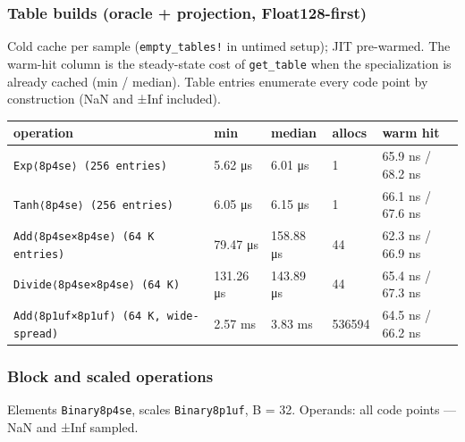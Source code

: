 \subsubsection{Table builds (oracle + projection, Float128-first)}



\label{17249747280115456051}{}


Cold cache per sample (\texttt{empty\_\allowbreak{}tables!} in untimed setup); JIT pre-warmed. The warm-hit column is the steady-state cost of \texttt{get\_\allowbreak{}table} when the specialization is already cached (min / median). Table entries enumerate every code point by construction (NaN and ±Inf included).




\begin{table}[h]
\centering
\begin{tabulary}{\linewidth}{L L L L L}
\toprule
operation & min & median & allocs & warm hit \\
\toprule
\texttt{Exp⟨8p4se⟩ (256 entries)} & 5.62 μs & 6.01 μs & 1 & 65.9 ns / 68.2 ns \\
\texttt{Tanh⟨8p4se⟩ (\allowbreak{}256 entries)} & 6.05 μs & 6.15 μs & 1 & 66.1 ns / 67.6 ns \\
\texttt{Add⟨8p4se×8p4se⟩ (\allowbreak{}64 K entries)} & 79.47 μs & 158.88 μs & 44 & 62.3 ns / 66.9 ns \\
\texttt{Divide⟨8p4se×8p4se⟩ (\allowbreak{}64 K)} & 131.26 μs & 143.89 μs & 44 & 65.4 ns / 67.3 ns \\
\texttt{Add⟨8p1uf×8p1uf⟩ (\allowbreak{}64 K, wide-spread)} & 2.57 ms & 3.83 ms & 536594 & 64.5 ns / 66.2 ns \\
\bottomrule
\end{tabulary}

\end{table}



\subsubsection{Block and scaled operations}



\label{17033350743052450193}{}


Elements \texttt{Binary8p4se}, scales \texttt{Binary8p1uf}, B = 32. Operands: all code points — NaN and ±Inf sampled.




